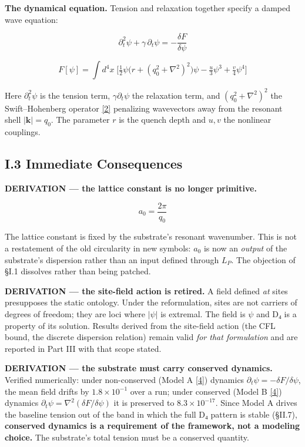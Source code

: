 \documentclass[a4paper,11pt]{article}
\begin{document}
\textbf{The dynamical equation.} Tension and relaxation together specify a damped wave equation:

\[\partial_t^2\psi+\gamma\,\partial_t\psi=-\frac{\delta F}{\delta\psi}\]

\[F[\psi]=\int d^4x\;\Big[\tfrac12\psi\big(r+(q_0^2+\nabla^2)^2\big)\psi-\tfrac{u}{3}\psi^3+\tfrac{v}{4}\psi^4\Big]\]

Here $\partial_t^2\psi$ is the tension term, $\gamma\partial_t\psi$ the relaxation term, and $(q_0^2+\nabla^2)^2$ the Swift–Hohenberg operator \hyperref[ref2]{[2]} penalizing wavevectors away from the resonant shell $|\mathbf{k}|=q_0$. The parameter $r$ is the quench depth and $u,v$ the nonlinear couplings.

\subsection*{I.3 Immediate Consequences}

\textbf{DERIVATION — the lattice constant is no longer primitive.}

\[a_0=\frac{2\pi}{q_0}\]

The lattice constant is fixed by the substrate's resonant wavenumber. This is not a restatement of the old circularity in new symbols: $a_0$ is now an \textit{output} of the substrate's dispersion rather than an input defined through $L_P$. The objection of §I.1 dissolves rather than being patched.

\textbf{DERIVATION — the site-field action is retired.} A field defined \textit{at} sites presupposes the static ontology. Under the reformulation, sites are not carriers of degrees of freedom; they are loci where $|\psi|$ is extremal. The field is $\psi$ and D₄ is a property of its solution. Results derived from the site-field action (the CFL bound, the discrete dispersion relation) remain valid \textit{for that formulation} and are reported in Part III with that scope stated.

\textbf{DERIVATION — the substrate must carry conserved dynamics.} Verified numerically: under non-conserved (Model A \hyperref[ref4]{[4]}) dynamics $\partial_t\psi=-\delta F/\delta\psi$, the mean field drifts by $1.8\times10^{-1}$ over a run; under conserved (Model B \hyperref[ref4]{[4]}) dynamics $\partial_t\psi=\nabla^2(\delta F/\delta\psi)$ it is preserved to $8.3\times10^{-17}$. Since Model A drives the baseline tension out of the band in which the full D₄ pattern is stable (§II.7), \textbf{conserved dynamics is a requirement of the framework, not a modeling choice.} The substrate's total tension must be a conserved quantity.
\end{document}
